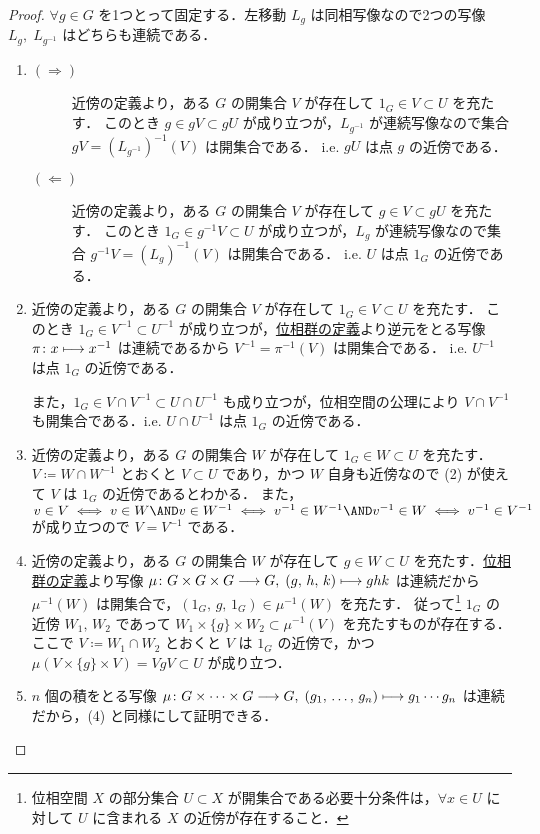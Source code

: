 \documentclass[algtopo_main]{subfiles}
\begin{document}
\begin{proof}
    $\forall g \in G$ を1つとって固定する．左移動 $L_{g}$ は同相写像なので2つの写像 $L_g,\; L_{g^{-1}}$ はどちらも連続である．
    \begin{enumerate}
        \item
        \begin{description}
            \item[\textbf{$\bm{(\Longrightarrow)}$}] 近傍の定義より，ある $G$ の開集合 $V$ が存在して $1_G \in V \subset U$ を充たす．
            このとき $g \in gV \subset gU$ が成り立つが，$L_{g^{-1}}$ が連続写像なので集合 $gV = (L_{g^{-1}})^{-1} (V)$ は開集合である．
            i.e. $gU$ は点 $g$ の近傍である．
            \item[\textbf{$\bm{(\Longleftarrow)}$}] 近傍の定義より，ある $G$ の開集合 $V$ が存在して $g \in V \subset gU$ を充たす．
            このとき $1_G \in g^{-1}V \subset U$ が成り立つが，$L_{g}$ が連続写像なので集合 $g^{-1}V = (L_{g})^{-1} (V)$ は開集合である．
            i.e. $U$ は点 $1_G$ の近傍である．
        \end{description}
        \item 
        近傍の定義より，ある $G$ の開集合 $V$ が存在して $1_G \in V \subset U$ を充たす．
        このとき $1_G \in V^{-1} \subset U^{-1}$ が成り立つが，\hyperref[def:TG]{位相群の定義}より逆元をとる写像 $\pi \colon x \longmapsto x^{-1}$ は連続であるから $V^{-1} = \pi^{-1} (V)$ は開集合である．
        i.e. $U^{-1}$ は点 $1_G$ の近傍である．
        
        また，$1_G \in V \cap V^{-1} \subset U \cap U^{-1}$ も成り立つが，位相空間の公理により $V \cap V^{-1}$ も開集合である．i.e. $U \cap U^{-1}$ は点 $1_G$ の近傍である．
        \item 
        近傍の定義より，ある $G$ の開集合 $W$ が存在して $1_G \in W \subset U$ を充たす．
        $V \coloneqq W \cap W^{-1}$ とおくと $V \subset U$ であり，かつ $W$ 自身も近傍なので (2) が使えて $V$ は $1_G$ の近傍であるとわかる．
        また，$v \in V \iff v \in W \AND v \in W^{-1} \iff v^{-1} \in W^{-1} \AND v^{-1} \in W \iff v^{-1} \in V^{-1}$ が成り立つので $V = V^{-1}$ である．
        \item 
        近傍の定義より，ある $G$ の開集合 $W$ が存在して $g \in W \subset U$ を充たす．\hyperref[def:TG]{位相群の定義}より写像 $\mu \colon G \times G \times G \longrightarrow G,\; (g,\, h,\, k) \longmapsto ghk$ は連続だから
        $\mu^{-1}(W)$ は開集合で，$(1_G,\, g,\, 1_G) \in \mu^{-1}(W)$ を充たす． 
        従って\footnote{位相空間 $X$ の部分集合 $U \subset X$ が開集合である必要十分条件は，$\forall x \in U$ に対して $U$ に含まれる $X$ の近傍が存在すること．} $1_G$ の近傍 $W_1,\, W_2$ であって $W_1 \times \{g\} \times W_2 \subset \mu^{-1}(V)$ を充たすものが存在する．ここで $V \coloneqq W_1 \cap W_2$ とおくと $V$ は $1_G$ の近傍で，かつ $\mu(V \times \{g\} \times V) = V g V \subset U$ が成り立つ．
        \item 
        $n$ 個の積をとる写像 $\mu \colon G \times \cdots \times G  \longrightarrow G,\; (g_1,\, \dots ,\,  g_n) \longmapsto g_1 \cdots g_n$ は連続だから，(4) と同様にして証明できる．
    \end{enumerate} 
\end{proof}
\end{document}
